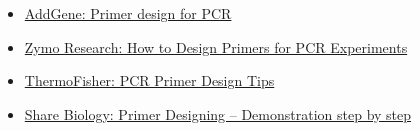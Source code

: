 \documentclass[letterpaper, 12pt]{article}
\begin{document}
\begin{itemize}
    \setlength\itemsep{-0.5em}
    \item \href{https://www.addgene.org/protocols/primer-design/}{AddGene: Primer design for PCR}
    \item \href{https://www.zymoresearch.com/blogs/blog/how-to-design-primers-for-pcr-experiments}{Zymo Research: How to Design Primers for PCR Experiments}
    \item \href{https://www.thermofisher.com/blog/behindthebench/pcr-primer-design-tips/}{ThermoFisher: PCR Primer Design Tips}
    \item \href{https://sharebiology.com/primer-designing-demonstration-step-by-step/}{Share Biology: Primer Designing – Demonstration step by step}
\end{itemize}
\end{document}
